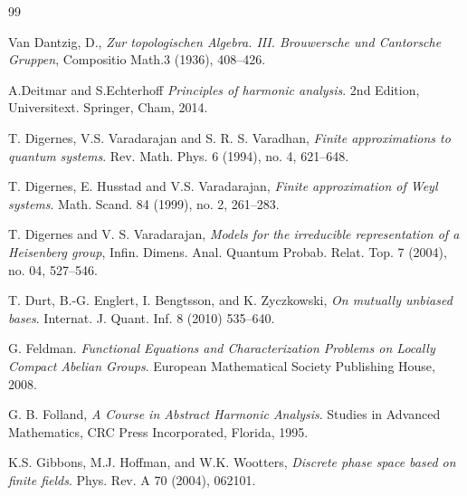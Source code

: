 \documentclass[12pt,reqno]{amsart}
\theoremstyle{definition}
\theoremstyle{definition}
\theoremstyle{definition}
\numberwithin{thm}{section}
\numberwithin{equation}{section}
\newcommand{\C}{\mathcal{C}}
\begin{document}
\begin{thebibliography}{99}

 Van Dantzig, D.,
\textit{Zur topologischen {A}lgebra. {III}. {B}rouwersche und
              {C}antorsche {G}ruppen},
Compositio Math.3 (1936), 408--426.

 A.Deitmar and S.Echterhoff
\textit{Principles of harmonic analysis}.
2nd Edition, Universitext. Springer, Cham, 2014.


T. Digernes, V.S. Varadarajan and S. R. S. Varadhan,
\textit{Finite approximations to quantum systems}. 
Rev. Math. Phys. 6 (1994), no. 4, 621--648.

T. Digernes, E. Husstad and V.S. Varadarajan,
\textit{Finite approximation of Weyl systems}.
Math. Scand. 84 (1999), no. 2, 261--283.


T. Digernes and V. S. Varadarajan, 
\textit{Models for the irreducible representation of a Heisenberg group},
Infin. Dimens. Anal. Quantum Probab. Relat. Top. 7 (2004), no. 04, 527--546.

 T. Durt, B.-G. Englert, I. Bengtsson, and K. Zyczkowski,
\textit{On mutually unbiased bases}.
Internat. J. Quant. Inf. 8 (2010) 535--640.



 G. Feldman. 
\textit{Functional Equations and Characterization Problems on Locally Compact
Abelian Groups}.
European Mathematical Society Publishing House, 2008.



G. B. Folland,
\textit{A Course in Abstract Harmonic Analysis}.
Studies in Advanced Mathematics, CRC Press Incorporated, Florida, 1995.

 K.S. Gibbons, M.J. Hoffman, and W.K. Wootters, 
\textit{Discrete phase space based on finite fields}.
Phys. Rev. A 70 (2004), 062101.


\end{thebibliography}
\end{document}
